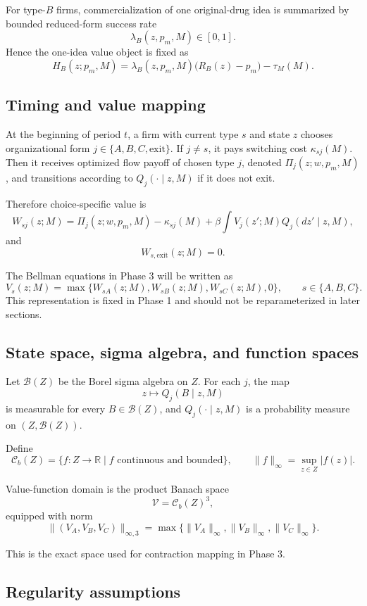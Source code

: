 For type-$B$ firms, commercialization of one original-drug idea is summarized by bounded reduced-form success rate
\[
\lambda_B(z,p_m,M)\in[0,1].
\]
Hence the one-idea value object is fixed as
\[
H_B(z;p_m,M)=\lambda_B(z,p_m,M)\bigl(R_B(z)-p_m\bigr)-\tau_M(M).
\]

\subsection{Timing and value mapping}

At the beginning of period $t$, a firm with current type $s$ and state $z$ chooses organizational form $j\in\{A,B,C,\text{exit}\}$. If $j\neq s$, it pays switching cost $\kappa_{sj}(M)$. Then it receives optimized flow payoff of chosen type $j$, denoted $\Pi_j(z;w,p_m,M)$, and transitions according to $Q_j(\cdot\mid z,M)$ if it does not exit.

Therefore choice-specific value is
\[
W_{sj}(z;M)=\Pi_j(z;w,p_m,M)-\kappa_{sj}(M)+\beta\int V_j(z';M)Q_j(dz'\mid z,M),
\]
and
\[
W_{s,\text{exit}}(z;M)=0.
\]

The Bellman equations in Phase 3 will be written as
\[
V_s(z;M)=\max\{W_{sA}(z;M),W_{sB}(z;M),W_{sC}(z;M),0\},\qquad s\in\{A,B,C\}.
\]
This representation is fixed in Phase 1 and should not be reparameterized in later sections.

\subsection{State space, sigma algebra, and function spaces}

Let $\mathcal B(Z)$ be the Borel sigma algebra on $Z$. For each $j$, the map
\[
z\mapsto Q_j(B\mid z,M)
\]
is measurable for every $B\in\mathcal B(Z)$, and $Q_j(\cdot\mid z,M)$ is a probability measure on $(Z,\mathcal B(Z))$.

Define
\[
\mathcal C_b(Z)=\{f:Z\to\mathbb R\mid f \text{ continuous and bounded}\},
\qquad
\|f\|_\infty=\sup_{z\in Z}|f(z)|.
\]

Value-function domain is the product Banach space
\[
\mathcal V=\mathcal C_b(Z)^3,
\]
equipped with norm
\[
\|(V_A,V_B,V_C)\|_{\infty,3}=\max\{\|V_A\|_\infty,\|V_B\|_\infty,\|V_C\|_\infty\}.
\]

This is the exact space used for contraction mapping in Phase 3.

\subsection{Regularity assumptions}

